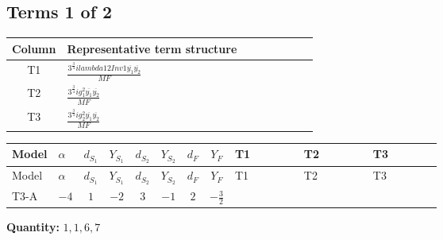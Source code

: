 \documentclass[8pt]{article}
\begin{document}
\begin{landscape}
\subsection*{Terms 1 of 2}
\begin{center}
\begin{tabular}{@{}c >{\raggedright\arraybackslash}p{0.82\linewidth}@{}}
\toprule
Column & Representative term structure \\
\midrule
T1 & \(\displaystyle \frac{3^{\frac{3}{4}} i lambda12Inv1 \overline{y_{1}} \overline{y_{2}}}{MF}\) \\
\midrule
T2 & \(\displaystyle \frac{3^{\frac{3}{4}} i g_{1}^{2} \overline{y_{1}} \overline{y_{2}}}{MF}\) \\
\midrule
T3 & \(\displaystyle \frac{3^{\frac{3}{4}} i g_{2}^{2} \overline{y_{1}} \overline{y_{2}}}{MF}\) \\
\midrule
\bottomrule
\end{tabular}
\end{center}
\smallskip
\tiny
\begin{longtable}{@{}llcccccc >{\raggedright\arraybackslash}p{0.21\linewidth} >{\raggedright\arraybackslash}p{0.21\linewidth} >{\raggedright\arraybackslash}p{0.21\linewidth}@{}}
\toprule
Model & $\alpha$ & $d_{S_1}$ & $Y_{S_1}$ & $d_{S_2}$ & $Y_{S_2}$ & $d_F$ & $Y_F$ & T1 & T2 & T3 \\
\midrule
\endfirsthead
\toprule
Model & $\alpha$ & $d_{S_1}$ & $Y_{S_1}$ & $d_{S_2}$ & $Y_{S_2}$ & $d_F$ & $Y_F$ & T1 & T2 & T3 \\
\midrule
\endhead
T3-A & $-4$ & $1$ & $-2$ & $3$ & $-1$ & $2$ & $-\frac{3}{2}$ & \scriptsize\adjustbox{max width=\linewidth}{$\begin{gathered} \frac{3^{\frac{3}{4}} i lambda12Inv1 \overline{y_{1}} \overline{y_{2}}}{6 MF}\end{gathered}$} & \scriptsize\adjustbox{max width=\linewidth}{$\begin{gathered} \frac{9 \cdot 3^{\frac{3}{4}} i g_{1}^{2} \overline{y_{1}} \overline{y_{2}}}{8 MF}\end{gathered}$} & \scriptsize\adjustbox{max width=\linewidth}{$\begin{gathered} \frac{11 \cdot 3^{\frac{3}{4}} i g_{2}^{2} \overline{y_{1}} \overline{y_{2}}}{8 MF}\end{gathered}$} \\
\midrule
\bottomrule
\end{longtable}
\clearpage
\noindent\textbf{Quantity: }$\mathrm{1,1,6,7}$\par\smallskip

\end{landscape}
\end{document}
